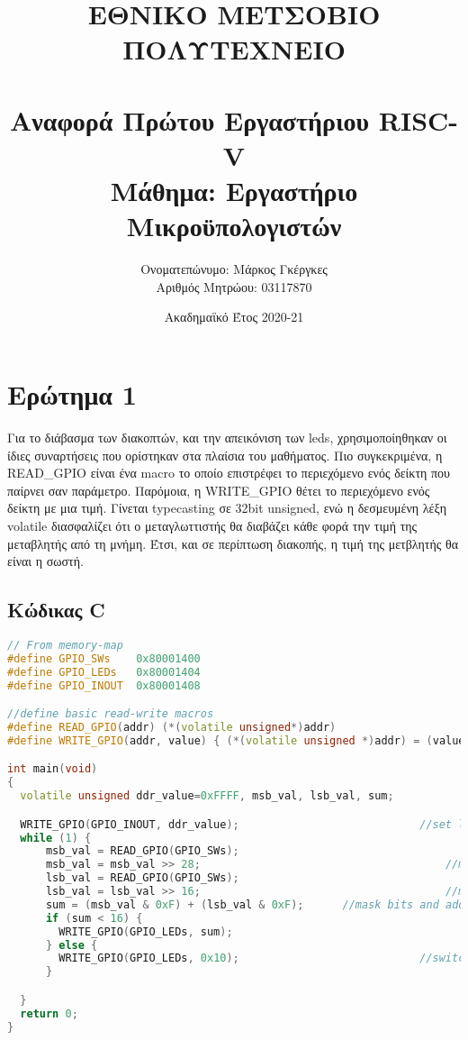 \documentclass[a4paper]{article}
\title{ΕΘΝΙΚΟ ΜΕΤΣΟΒΙΟ ΠΟΛΥΤΕΧΝΕΙΟ\\ ~\\Αναφορά Πρώτου Εργαστήριου RISC-V\\Μάθημα: Εργαστήριο Μικροϋπολογιστών}
\author{Ονοματεπώνυμο: Μάρκος Γκέργκες\\ Αριθμός Μητρώου: 03117870}
\date{Ακαδημαϊκό Έτος 2020-21 }
\begin{document}
\maketitle

\section*{Ερώτημα 1}
\par Για το διάβασμα των διακοπτών, και την απεικόνιση των leds, χρησιμοποίηθηκαν οι ίδιες συναρτήσεις που ορίστηκαν στα πλαίσια του μαθήματος. Πιο συγκεκριμένα, η READ\_GPIO 
είναι ένα macro το οποίο επιστρέφει το περιεχόμενο ενός δείκτη που παίρνει σαν παράμετρο. Παρόμοια, η WRITE\_GPIO θέτει το περιεχόμενο ενός δείκτη με μια τιμή. Γίνεται typecasting 
σε 32bit unsigned, ενώ η δεσμευμένη λέξη volatile διασφαλίζει ότι ο μεταγλωττιστής θα διαβάζει κάθε φορά την τιμή της μεταβλητής από τη μνήμη. Έτσι, και σε περίπτωση διακοπής, η 
τιμή της μετβλητής θα είναι η σωστή. 
\subsection*{Κώδικας C}
\begin{lstlisting}[language=C++, keywordstyle=\color{red}, basicstyle=\small]
// From memory-map
#define GPIO_SWs    0x80001400
#define GPIO_LEDs   0x80001404
#define GPIO_INOUT  0x80001408

//define basic read-write macros
#define READ_GPIO(addr) (*(volatile unsigned*)addr)
#define WRITE_GPIO(addr, value) { (*(volatile unsigned *)addr) = (value);}

int main(void) 
{
  volatile unsigned ddr_value=0xFFFF, msb_val, lsb_val, sum;

  WRITE_GPIO(GPIO_INOUT, ddr_value);							//set leds as output
  while (1) {
      msb_val = READ_GPIO(GPIO_SWs);
      msb_val = msb_val >> 28;										//move 4msb of switches to lsb
      lsb_val = READ_GPIO(GPIO_SWs);
      lsb_val = lsb_val >> 16;										//move 4lsb of switches to lsb
      sum = (msb_val & 0xF) + (lsb_val & 0xF);		//mask bits and add them
      if (sum < 16) {
	    WRITE_GPIO(GPIO_LEDs, sum);
      } else {
        WRITE_GPIO(GPIO_LEDs, 0x10);							//switch 5th led ON(index-1)
      }

  }
  return 0;
}
\end{lstlisting}
\end{document}
